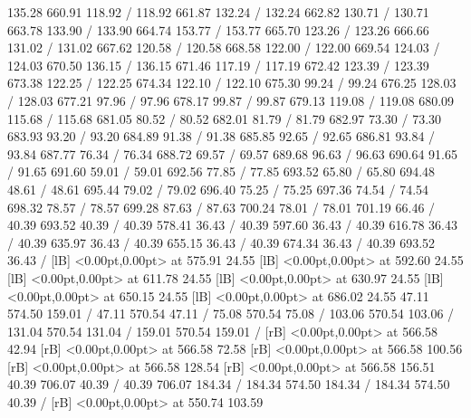 { 135.28 660.91 118.92 /
 118.92 661.87 132.24 /
 132.24 662.82 130.71 /
 130.71 663.78 133.90 /
 133.90 664.74 153.77 /
 153.77 665.70 123.26 /
 123.26 666.66 131.02 /
 131.02 667.62 120.58 /
 120.58 668.58 122.00 /
 122.00 669.54 124.03 /
 124.03 670.50 136.15 /
 136.15 671.46 117.19 /
 117.19 672.42 123.39 /
 123.39 673.38 122.25 /
 122.25 674.34 122.10 /
 122.10 675.30 99.24 /
 99.24 676.25 128.03 /
 128.03 677.21 97.96 /
 97.96 678.17 99.87 /
 99.87 679.13 119.08 /
 119.08 680.09 115.68 /
 115.68 681.05 80.52 /
 80.52 682.01 81.79 /
 81.79 682.97 73.30 /
 73.30 683.93 93.20 /
 93.20 684.89 91.38 /
 91.38 685.85 92.65 /
 92.65 686.81 93.84 /
 93.84 687.77 76.34 /
 76.34 688.72 69.57 /
 69.57 689.68 96.63 /
 96.63 690.64 91.65 /
 91.65 691.60 59.01 /
 59.01 692.56 77.85 /
 77.85 693.52 65.80 /
 65.80 694.48 48.61 /
 48.61 695.44 79.02 /
 79.02 696.40 75.25 /
 75.25 697.36 74.54 /
 74.54 698.32 78.57 /
 78.57 699.28 87.63 /
 87.63 700.24 78.01 /
 78.01 701.19 66.46 /
\setsolid
{} 40.39 693.52 40.39 /
\setsolid
{} 40.39 578.41 36.43 /
\setsolid
{} 40.39 597.60 36.43 /
\setsolid
{} 40.39 616.78 36.43 /
\setsolid
{} 40.39 635.97 36.43 /
\setsolid
{} 40.39 655.15 36.43 /
\setsolid
{} 40.39 674.34 36.43 /
\setsolid
{} 40.39 693.52 36.43 /
  [lB] <0.00pt,0.00pt> at 575.91 24.55
  [lB] <0.00pt,0.00pt> at 592.60 24.55
  [lB] <0.00pt,0.00pt> at 611.78 24.55
  [lB] <0.00pt,0.00pt> at 630.97 24.55
  [lB] <0.00pt,0.00pt> at 650.15 24.55
  [lB] <0.00pt,0.00pt> at 686.02 24.55
\setsolid
{} 47.11 574.50 159.01 /
\setsolid
{} 47.11 570.54 47.11 /
\setsolid
{} 75.08 570.54 75.08 /
\setsolid
{} 103.06 570.54 103.06 /
\setsolid
{} 131.04 570.54 131.04 /
\setsolid
{} 159.01 570.54 159.01 /
 [rB] <0.00pt,0.00pt> at 566.58 42.94
 [rB] <0.00pt,0.00pt> at 566.58 72.58
 [rB] <0.00pt,0.00pt> at 566.58 100.56
 [rB] <0.00pt,0.00pt> at 566.58 128.54
 [rB] <0.00pt,0.00pt> at 566.58 156.51
\setsolid
{} 40.39 706.07 40.39 /
 40.39 706.07 184.34 /
 184.34 574.50 184.34 /
 184.34 574.50 40.39 /
 [rB] <0.00pt,0.00pt> at 550.74 103.59
\endpicture
}
